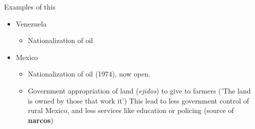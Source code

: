Examples of this
\begin{itemize}
	\item Venezuela
	\begin{itemize}
		\item Nationalization of oil
	\end{itemize}
	\item Mexico
	\begin{itemize}
	  	\item Nationalization of oil (1974), now open.
	  	\item Government appropriation of land (\textit{ejidos}) to give to farmers ('The land is owned by those that work it')
	  		\subitem This lead to less government control of rural Mexico, and less services like education or policing (source of \textbf{narcos})  
    \end{itemize}  
\end{itemize}




